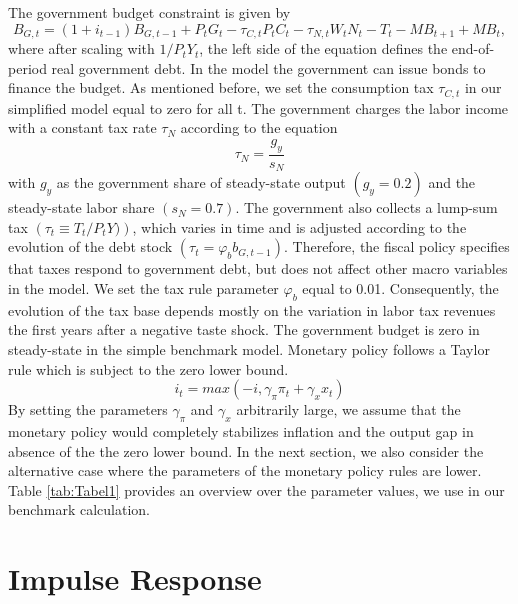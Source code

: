 \documentclass[12pt,a4paper,oneside,titlepage]{article}
\begin{document}
The government budget constraint is given by
\begin{equation}
B_{G,t} = \left(1 + i_{t-1}\right)B_{G,t-1} + P_tG_t - \tau_{C,t}P_tC_t - \tau_{N,t}W_tN_t - T_t - MB_{t+1} + MB_t,  \nonumber
\end{equation}
where after scaling with $1/ P_tY_t$, the left side of the equation defines the end-of-period real government debt. In the model the government can issue bonds to finance the budget. As mentioned before, we set the consumption tax $\tau_{C,t}$ in our simplified model equal to zero for all t. The government charges the labor income with a constant tax rate $\tau_N$ according to the equation \[\tau_N = \frac{g_y}{s_N}\] with $g_y$ as the government share of steady-state output $\left(g_y = 0.2 \right)$ and the steady-state labor share $\left(s_N = 0.7\right)$.
The government also collects a lump-sum tax $\left(\tau_t \equiv T_t/P_tY)\right)$, which varies in time and is adjusted according to the evolution of the debt stock $\left(\tau_t = \varphi_b b_{G,t-1}\right)$. Therefore, the fiscal policy specifies that taxes respond to government debt, but does not affect other macro variables in the model. We set the tax rule parameter $\varphi_b$ equal to 0.01. Consequently, the evolution of the tax base depends mostly on the variation in labor tax revenues the first years after a negative taste shock. The government budget is zero in steady-state in the simple benchmark model.\newline
Monetary policy follows a Taylor rule which is subject to the zero lower bound.
\begin{equation}
i_t = max \left(-i, \gamma_{\pi} \pi_t + \gamma_x x_t\right)  \nonumber
\end{equation}
By setting the parameters $\gamma_{\pi}$ and $\gamma_x$ arbitrarily large, we assume that the monetary policy would completely stabilizes inflation and the output gap in absence of the the zero lower bound. In the next section, we also consider the alternative case where the parameters of the monetary policy rules are lower.\newline
Table \ref{tab:Tabel1} provides an overview over the parameter values, we use in our benchmark calculation.
\bigskip


\section{Impulse Response}
\end{document}
